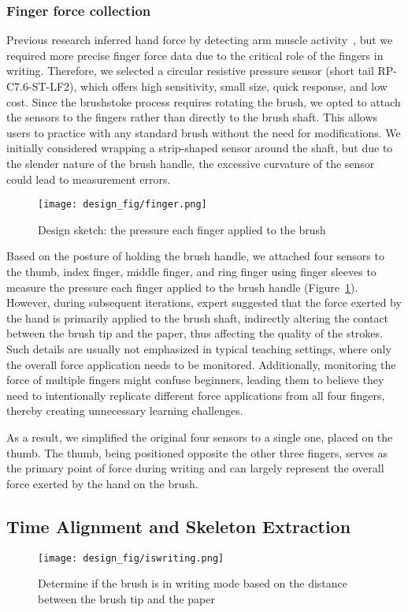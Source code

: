 \subsubsection{Finger force collection}
Previous research inferred hand force by detecting arm muscle activity~\cite{10269740, 10340786}, but we required more precise finger force data due to the critical role of the fingers in writing. Therefore, we selected a circular resistive pressure sensor (short tail RP-C7.6-ST-LF2), which offers high sensitivity, small size, quick response, and low cost. Since the brushstoke process requires rotating the brush, we opted to attach the sensors to the fingers rather than directly to the brush shaft. This allows users to practice with any standard brush without the need for modifications. We initially considered wrapping a strip-shaped sensor around the shaft, but due to the slender nature of the brush handle, the excessive curvature of the sensor could lead to measurement errors.
\begin{figure}[t!]
  \centering
  \texttt{[image: design\_fig/finger.png]}
  \caption{Design sketch: the pressure each finger applied to the brush}
  \label{fig: finger}
\end{figure}
Based on the posture of holding the brush handle, we attached four sensors to the thumb, index finger, middle finger, and ring finger using finger sleeves to measure the pressure each finger applied to the brush handle (Figure~\ref{fig: finger}). However, during subsequent iterations, expert suggested that the force exerted by the hand is primarily applied to the brush shaft, indirectly altering the contact between the brush tip and the paper, thus affecting the quality of the strokes. Such details are usually not emphasized in typical teaching settings, where only the overall force application needs to be monitored. Additionally, monitoring the force of multiple fingers might confuse beginners, leading them to believe they need to intentionally replicate different force applications from all four fingers, thereby creating unnecessary learning challenges.

As a result, we simplified the original four sensors to a single one, placed on the thumb. The thumb, being positioned opposite the other three fingers, serves as the primary point of force during writing and can largely represent the overall force exerted by the hand on the brush.


\subsection{Time Alignment and Skeleton Extraction}
 \begin{figure*}[htbp]
    \centering
    \texttt{[image: design\_fig/iswriting.png]}
    \caption{Determine if the brush is in writing mode based on the distance between the brush tip and the paper}
    \label{fig: Pen up and Down}
\end{figure*}
